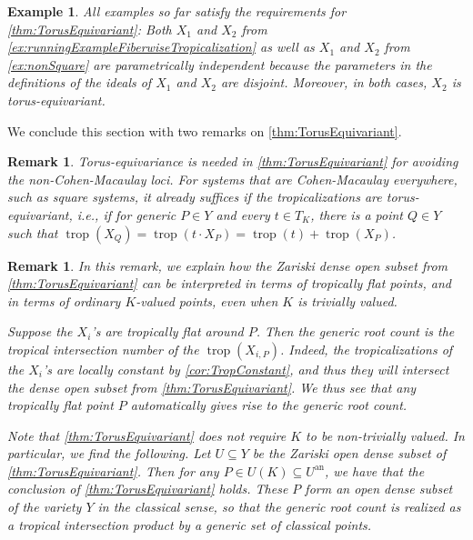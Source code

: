 \documentclass[12pt,reqno,a4paper]{amsart}
\theoremstyle{theoremstyle}
\theoremstyle{examplestyle}
\newtheorem{example}[theorem]{Example}
\newtheorem{remark}[theorem]{Remark}
\theoremstyle{algorithmstyle}
\newcommand{\an}{{\mathrm{an}}}
\DeclareMathOperator{\trop}{trop}
\begin{document}
\begin{example}
  All examples so far satisfy the requirements for \cref{thm:TorusEquivariant}:
  Both $X_1$ and $X_2$ from \cref{ex:runningExampleFiberwiseTropicalization} as well as $X_1$ and $X_2$ from \cref{ex:nonSquare} are parametrically independent because the parameters in the definitions of the ideals of $X_1$ and $X_2$ are disjoint.  Moreover, in both cases, $X_2$ is torus-equivariant.
\end{example}

We conclude this section with two remarks on \cref{thm:TorusEquivariant}.

\begin{remark}
  Torus-equivariance is needed in \cref{thm:TorusEquivariant} for avoiding the non-Cohen-Macaulay loci.  For systems that are Cohen-Macaulay everywhere, such as square systems, it already suffices if the tropicalizations are torus-equivariant, i.e., if for generic $P\in Y$ and every $t\in T_K$, there is a point $Q\in Y$ such that $\trop(X_{Q})=\trop(t\cdot X_{P})=\trop(t)+\trop(X_{P})$.
\end{remark}

\begin{remark}\label{rem:TropicallyFlatTorusEquivariant}
In this remark, we explain how the Zariski dense open subset from  \cref{thm:TorusEquivariant} can be interpreted in terms of tropically flat points, and in terms of ordinary $K$-valued points, even when $K$ is trivially valued.
%

Suppose the $X_{i}$'s are tropically flat around $P$. Then the generic root count is the tropical intersection number of the $\trop(X_{i,P})$. Indeed, the tropicalizations of the $X_{i}$'s are locally constant by \cref{cor:TropConstant}, and thus they will intersect the dense open subset from \cref{thm:TorusEquivariant}. We thus see that any tropically flat point $P$ automatically gives rise to the generic root count.
%
%

    Note that \cref{thm:TorusEquivariant} does not require $K$ to be non-trivially valued. In particular, we find the following. Let $U\subseteq Y$ be the Zariski open dense subset of \cref{thm:TorusEquivariant}. Then for any $P\in U(K)\subseteq U^{\an}$, we have that the conclusion of \cref{thm:TorusEquivariant} holds. These $P$ form an open dense subset of the variety $Y$ in the classical sense, so that the generic root count is realized as a tropical intersection product by a generic set of classical points.
%

%
\end{remark}
\end{document}
